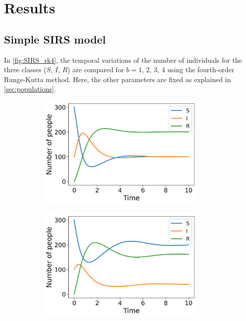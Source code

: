\documentclass[../main.tex]{subfiles}
\begin{document}
\section{Results}\label{sec:results}

\subsection{Simple SIRS model}
In \cref{fig:SIRS_rk4}, the temporal variations of the number of individuals for the three classes ($S$, $I$, $R$) are compared for $b=1$, 2, 3, 4 using the fourth-order Runge-Kutta method. Here, the other parameters are fixed as explained in \cref{sec:populations}. 

\begin{figure}[htb!]
    \centering
    \begin{subfigure}[b]{0.475\textwidth}
    \centering
    \includegraphics[width=0.9\textwidth]{../figures/SIRS_rk4_b=1.png}
    \caption{}
    \label{fig:b=1}
    \end{subfigure}
    \quad
    \begin{subfigure}[b]{0.475\textwidth}
    \includegraphics[width=0.9\textwidth]{../figures/SIRS_rk4_b=2.png}
    \caption{}
    \label{fig:b=2}
    \end{subfigure}
    

\end{figure}
\end{document}
